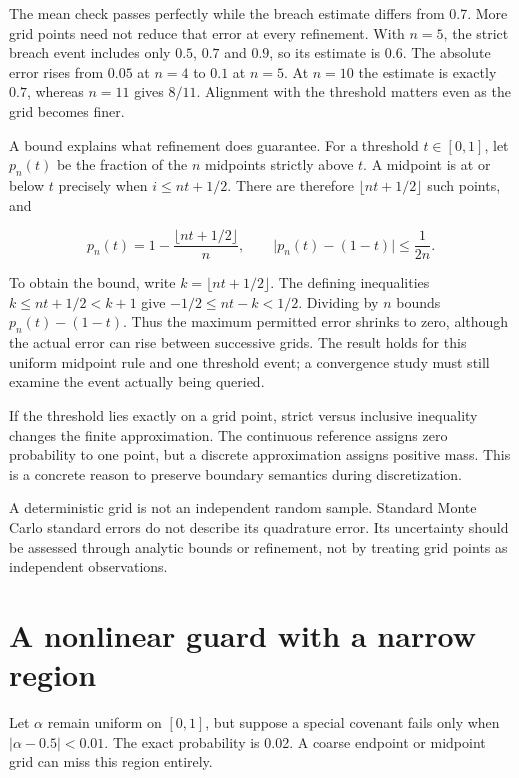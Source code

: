 The mean check passes perfectly while the breach estimate differs from 0.7. More grid points need not reduce that error at every refinement. With $n=5$, the strict breach event includes only $0.5$, $0.7$ and $0.9$, so its estimate is $0.6$. The absolute error rises from $0.05$ at $n=4$ to $0.1$ at $n=5$. At $n=10$ the estimate is exactly $0.7$, whereas $n=11$ gives $8/11$. Alignment with the threshold matters even as the grid becomes finer.

A bound explains what refinement does guarantee. For a threshold $t\in[0,1]$, let $p_n(t)$ be the fraction of the $n$ midpoints strictly above $t$. A midpoint is at or below $t$ precisely when $i\leq nt+1/2$. There are therefore $\lfloor nt+1/2\rfloor$ such points, and

\begin{equation}
\label{eq:midpoint-threshold-bound}
p_n(t)=1-\frac{\lfloor nt+1/2\rfloor}{n},
\qquad
\bigl|p_n(t)-(1-t)\bigr|\leq\frac{1}{2n}.
\end{equation}

To obtain the bound, write $k=\lfloor nt+1/2\rfloor$. The defining inequalities $k\leq nt+1/2<k+1$ give $-1/2\leq nt-k<1/2$. Dividing by $n$ bounds $p_n(t)-(1-t)$. Thus the maximum permitted error shrinks to zero, although the actual error can rise between successive grids. The result holds for this uniform midpoint rule and one threshold event; a convergence study must still examine the event actually being queried.

If the threshold lies exactly on a grid point, strict versus inclusive inequality changes the finite approximation. The continuous reference assigns zero probability to one point, but a discrete approximation assigns positive mass. This is a concrete reason to preserve boundary semantics during discretization.

A deterministic grid is not an independent random sample. Standard Monte Carlo standard errors do not describe its quadrature error. Its uncertainty should be assessed through analytic bounds or refinement, not by treating grid points as independent observations.

\section{A nonlinear guard with a narrow region}
Let $\alpha$ remain uniform on $[0,1]$, but suppose a special covenant fails only when $|\alpha-0.5|<0.01$. The exact probability is 0.02. A coarse endpoint or midpoint grid can miss this region entirely.

